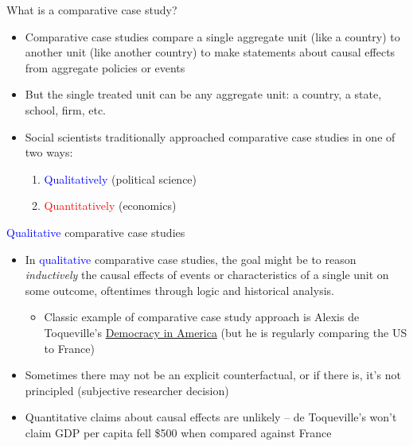 \documentclass{beamer}
\begin{document}
\begin{frame}{What is a comparative case study?}

\begin{itemize}
\item Comparative case studies compare a single aggregate unit (like a country) to another unit (like another country) to make statements about causal effects from aggregate policies or events
\item But the single treated unit can be any aggregate unit: a country, a state, school, firm, etc. 
\item Social scientists traditionally approached comparative case studies in one of two ways:
	\begin{enumerate}
	\item \textcolor{blue}{Qualitatively} (political science)
	\item \textcolor{red}{Quantitatively} (economics)
	\end{enumerate}
\end{itemize}

\end{frame}


\begin{frame}{\textcolor{blue}{Qualitative} comparative case studies}
	
	\begin{itemize}
	\item In \textcolor{blue}{qualitative} comparative case studies, the goal might be to reason \emph{inductively} the causal effects of events or characteristics of a single unit on some outcome, oftentimes through logic and historical analysis.  
		\begin{itemize}
		\item Classic example of comparative case study approach is Alexis de Toqueville's \underline{Democracy in America} (but he is regularly comparing the US to France)
		\end{itemize}
	\item Sometimes there may not be an explicit counterfactual, or if there is, it's not principled (subjective researcher decision)
	\item Quantitative claims about causal effects are unlikely -- de Toqueville's won't claim GDP per capita fell \$500 when compared against France
	\end{itemize}
\end{frame}
\end{document}
